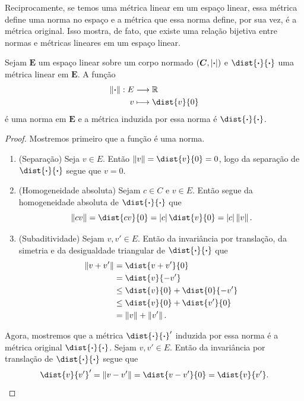 Reciprocamente, se temos uma métrica linear em um espaço linear, essa métrica define uma norma no espaço e a métrica que essa norma define, por sua vez, é a métrica original. Isso mostra, de fato, que existe uma relação bijetiva entre normas e métricas lineares em um espaço linear.

\begin{prop}
Sejam $\bm E$ um espaço linear sobre um corpo normado $(\bm C,\left\vert{\bm{\cdot}}\right\vert)$ e $\dist{\var}{\var}$ uma métrica linear em $\bm E$. A função
	\begin{align*}
	\func{\nor{\var}}{E}{\R}{v}{\dist{v}{0}}
	\end{align*}
é uma norma em $\bm E$ e a métrica induzida por essa norma é $\dist{\var}{\var}$.
\end{prop}
\begin{proof}
Mostremos primeiro que a função é uma norma.
	\begin{enumerate}
	\item (Separação) Seja $v \in E$. Então $\nor{v} = \dist{v}{0} = 0$, logo da separação de $\dist{\var}{\var}$ segue que $v=0$.
	
	\item (Homogeneidade absoluta) Sejam $c \in C$ e $v \in E$. Então segue da homogeneidade absoluta de $\dist{\var}{\var}$ que
		\begin{equation*}
		\nor{cv} = \dist{cv}{0} = \abs{c}\dist{v}{0} = \abs{c}\nor{v}.
		\end{equation*}
	
	\item (Subaditividade) Sejam $v,v' \in E$. Então da invariância por translação, da simetria e da desigualdade triangular de $\dist{\var}{\var}$ que
		\begin{align*}
		\nor{v+v'} &= \dist{v+v'}{0} \\
			&= \dist{v}{-v'} \\
			&\leq \dist{v}{0} + \dist{0}{-v'} \\
			&\leq \dist{v}{0} + \dist{v'}{0} \\
			&= \nor{v} + \nor{v'}.
		\end{align*}
	\end{enumerate}
Agora, mostremos que a métrica $\dist{\var}{\var}'$ induzida por essa norma é a métrica original $\dist{\var}{\var}$. Sejam $v,v' \in E$. Então da invariância por translação de $\dist{\var}{\var}$ segue que
	\begin{equation*}
	\dist{v}{v'}' = \nor{v-v'} = \dist{v-v'}{0} = \dist{v}{v'}. \qedhere
	\end{equation*}
\end{proof}

